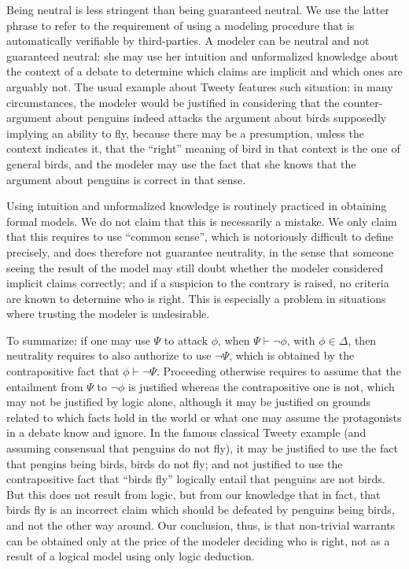 \documentclass[version=3.21, pagesize, twoside=off, bibliography=totoc, DIV=calc, fontsize=12pt, a4paper, french, english]{scrartcl}
\begin{document}
\begin{remark}
	Being neutral is less stringent than being guaranteed neutral. We use the latter phrase to refer to the requirement of using a modeling procedure that is automatically verifiable by third-parties. A modeler can be neutral and not guaranteed neutral: she may use her intuition and unformalized knowledge about the context of a debate to determine which claims are implicit and which ones are arguably not. The usual example about Tweety features such situation: in many circumstances, the modeler would be justified in considering that the counter-argument about penguins indeed attacks the argument about birds supposedly implying an ability to fly, because there may be a presumption, unless the context indicates it, that the “right” meaning of bird in that context is the one of general birds, and the modeler may use the fact that she knows that the argument about penguins is correct in that sense. 
	
	Using intuition and unformalized knowledge is routinely practiced in obtaining formal models. 
	We do not claim that this is necessarily a mistake. We only claim that this requires to use “common sense”, which is notoriously difficult to define precisely, and does therefore not guarantee neutrality, in the sense that someone seeing the result of the model may still doubt whether the modeler considered implicit claims correctly; and if a suspicion to the contrary is raised, no criteria are known to determine who is right. This is especially a problem in situations where trusting the modeler is undesirable.
	
	To summarize: if one may use $\Psi$ to attack $\phi$, when $\Psi \vdash ¬\phi$, with $\phi \in \Delta$, then neutrality requires to also authorize to use $¬\Psi$, which is obtained by the contrapositive fact that $\phi \vdash ¬\Psi$.
	Proceeding otherwise requires to assume that the entailment from $\Psi$ to $¬\phi$ is justified whereas the contrapositive one is not, which may not be justified by logic alone, although it may be justified on grounds related to which facts hold in the world or what one may assume the protagonists in a debate know and ignore. In the famous classical Tweety example (and assuming consensual that penguins do not fly), it may be justified to use the fact that pengins being birds, birds do not fly; and not justified to use the contrapositive fact that “birds fly” logically entail that penguins are not birds. But this does not result from logic, but from our knowledge that in fact, that birds fly is an incorrect claim which should be defeated by penguins being birds, and not the other way around. Our conclusion, thus, is that non-trivial warrants can be obtained only at the price of the modeler deciding who is right, not as a result of a logical model using only logic deduction.
\end{remark}
\end{document}

